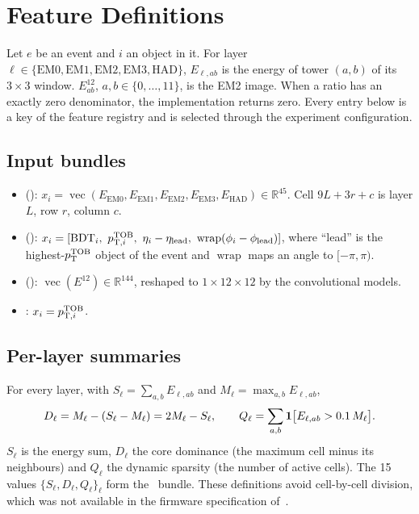 \section{Feature Definitions}
\label{app:features}
Let $e$ be an event and $i$ an object in it. For layer $\ell\in\{\mathrm{EM0},\mathrm{EM1},\mathrm{EM2},\mathrm{EM3},\mathrm{HAD}\}$, $E_{\ell,ab}$ is the energy of tower $(a,b)$ of its $3\times3$ window. $E^{12}_{ab}$, $a,b\in\{0,\dots,11\}$, is the EM2 image. When a ratio has an exactly zero denominator, the implementation returns zero. Every entry below is a key of the feature registry and is selected through the experiment configuration.

\subsection{Input bundles}
\begin{itemize}
  \item {} (\CT): $x_i=\operatorname{vec}(E_{\mathrm{EM0}},E_{\mathrm{EM1}},E_{\mathrm{EM2}},E_{\mathrm{EM3}},E_{\mathrm{HAD}})\in\mathbb{R}^{45}$. Cell $9L+3r+c$ is layer $L$, row $r$, column $c$.
  \item {} (\CP): $x_i=[\mathrm{BDT}_i,\ \ptTOBof{i},\ \eta_i-\eta_{\mathrm{lead}},\ \operatorname{wrap}(\phi_i-\phi_{\mathrm{lead}})]$, where ``lead'' is the highest-$p_{\mathrm{T}}^{\mathrm{TOB}}$ object of the event and $\operatorname{wrap}$ maps an angle to $[-\pi,\pi)$.
  \item {} (\EMtwo): $\operatorname{vec}(E^{12})\in\mathbb{R}^{144}$, reshaped to $1\times12\times12$ by the convolutional models.
  \item {}: $x_i=p_{\mathrm{T},i}^{\mathrm{TOB}}$.
\end{itemize}

\subsection{Per-layer summaries}
\label{app:layer_summaries}
For every layer, with $S_\ell=\sum_{a,b}E_{\ell,ab}$ and $M_\ell=\max_{a,b}E_{\ell,ab}$,
\begin{equation}
  D_\ell = M_\ell-(S_\ell-M_\ell)=2M_\ell-S_\ell,\qquad
  Q_\ell=\sum_{a,b}\mathbf{1}\big[E_{\ell,ab}>0.1\,M_\ell\big].
\end{equation}
$S_\ell$ is the energy sum, $D_\ell$ the core dominance (the maximum cell minus its neighbours) and $Q_\ell$ the dynamic sparsity (the number of active cells). The 15 values $\{S_\ell,D_\ell,Q_\ell\}_\ell$ form the \SUM\ bundle. These definitions avoid cell-by-cell division, which was not available in the firmware specification of~\cite{kernan2026}.

